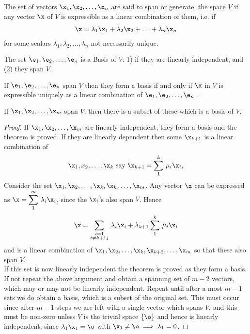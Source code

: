 \begin{definition}[Span]
The set of vectors $\x_1, \x_2, \hdots, \x_n$ are said to span or generate, the space $V$ if any vector $\x$ of $V$ is expressible as a linear combination of them, i.e. if 
\[ \x = \lambda_1 \x_1 + \lambda_2 \x_2 + \hdots + \lambda_n \x_n \] for some scalars $\lambda_1, \lambda_2, \hdots, \lambda_n$ not necessarily unique. 
\end{definition}

\begin{definition}[Basis]
The set $\e_1, \e_2, \hdots, \e_n$ is a Basis of $V$: 1) if they are linearly independent; and (2) they span $V$. 
\end{definition}

\begin{theorem}
If $\e_1, \e_2, \hdots, \e_n$ span $V$ then they form a basis if and only if $\x$ in $V$ is expressible uniquely as a linear combination of $\e_1, \e_2, \hdots, \e_n$ .
\end{theorem}

\begin{theorem}
If $\x_1, \x_2, \hdots, \x_m$ span $V$, then there is a subset of these which is a basis of $V$. \label{SpanningSubset}
\end{theorem}
\begin{proof}
If $\x_1, \x_2, \hdots, \x_m$ are linearly independent, they form a basis and the theorem is proved. If they are linearly dependent then some $\x_{k+1}$ is a linear
combination of 
\[  \x_1, x_2, \hdots, \x_k  \mbox{ say } \x_{k+1} = \sum_1^k\, \mu_i \x_i ,  \]
Consider the set $\x_1, \x_2, \hdots, \x_k, \x_{k_2} \hdots, \x_m$. Any vector $\x$ can be expressed as $\displaystyle \x = \sum_1^m \, \lambda_i \x_i$, since the $\x_i$'s also span $V$. 
Hence  
\[ \x = \sum_{\substack{i = 1\\ i\ne k+1j}} \, \lambda_i \x_i  +\lambda_{k+1} \sum_1^k\, \mu_i\x_i  \]
and is a linear combination of $\x_1, \x_2, \hdots, \x_k, \x_{k+2}, \hdots, \x_m$ so that these also span $V$.\\

If this set is now linearly independent the theorem is proved as they form a basis. If not repeat the above argument and obtain a spanning set of $m-2$ vectors, which may or may not
be linearly independent. Repeat until after a most $m-1$ sets we do obtain a basis, which is a subset of the original set. This must occur since after $m-1$ steps we are left with a single vector
which spans $V$, and this must be non-zero unless $V$ is the trivial space $\{ \o \}$ and hence is linearly independent, since $\lambda_1 \x_1 = \o$ with $\x_1 \ne \o \implies \lambda_1 = 0$. 
\end{proof}

